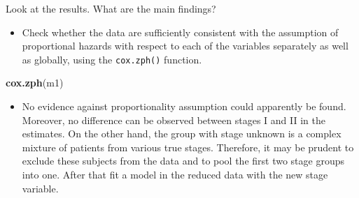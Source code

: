 \documentclass[
]{book}
\newenvironment{Shaded}{\begin{snugshade}}{\end{snugshade}}
\newcommand{\AttributeTok}[1]{\textcolor[rgb]{0.13,0.29,0.53}{#1}}
\newcommand{\CommentTok}[1]{\textcolor[rgb]{0.56,0.35,0.01}{\textit{#1}}}
\newcommand{\DecValTok}[1]{\textcolor[rgb]{0.00,0.00,0.81}{#1}}
\newcommand{\FunctionTok}[1]{\textcolor[rgb]{0.13,0.29,0.53}{\textbf{#1}}}
\newcommand{\NormalTok}[1]{#1}
\newcommand{\OtherTok}[1]{\textcolor[rgb]{0.56,0.35,0.01}{#1}}
\newcommand{\SpecialCharTok}[1]{\textcolor[rgb]{0.81,0.36,0.00}{\textbf{#1}}}
\newcommand{\StringTok}[1]{\textcolor[rgb]{0.31,0.60,0.02}{#1}}
\providecommand{\tightlist}{%
  \setlength{\itemsep}{0pt}\setlength{\parskip}{0pt}}
\begin{document}
Look at the results. What are the main findings?

\begin{itemize}
\tightlist
\item
  Check whether the data are sufficiently consistent with the
  assumption of proportional hazards with respect to each of
  the variables separately
  as well as globally, using the \texttt{cox.zph()} function.
\end{itemize}

\begin{Shaded}
\begin{Highlighting}[]
\FunctionTok{cox.zph}\NormalTok{(m1)}
\end{Highlighting}
\end{Shaded}

\begin{itemize}
\tightlist
\item
  No evidence against proportionality assumption could apparently be found.
  Moreover, no difference can be observed between stages I and II in the estimates.
  On the other hand, the
  group with stage unknown is a complex mixture of patients from various
  true stages. Therefore, it may be prudent to exclude these subjects from the data
  and to pool the first two stage groups into one. After that fit a model in
  the reduced data with the new stage variable.
\end{itemize}

\begin{Shaded}
\end{Shaded}
\end{document}
